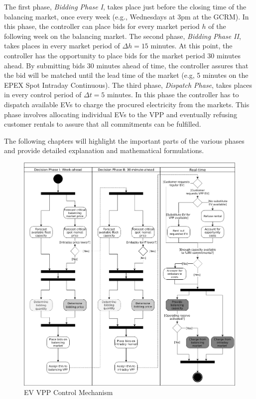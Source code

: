 \documentclass[a4paper, 12pt]{article}
\begin{document}
The first phase, \emph{Bidding Phase I}, takes place just before the closing time of
the balancing market, once every week (e.g., Wednesdays at 3pm at the GCRM). In
this phase, the controller can place bids for every market period \(h\) of the
following week on the balancing market. The second phase, \emph{Bidding Phase II},
takes places in every market period of \(\Delta{h}\!=\!15\) minutes. At this
point, the controller has the opportunity to place bids for the market period 30
minutes ahead. By submitting bids 30 minutes ahead of time, the controller
assures that the bid will be matched until the lead time of the market (e.g, 5
minutes on the EPEX Spot Intraday Continuous). The third phase, \emph{Dispatch
Phase}, takes places in every control period of \(\Delta{t}\!=\!5\) minutes. In
this phase the controller has to dispatch available EVs to charge the procured
electricity from the markets. This phase involves allocating individual EVs to
the VPP and eventually refusing customer rentals to assure that all commitments
can be fulfilled.

The following chapters will highlight the important parts of the various phases
and provide detailed explanation and mathematical formulations.

\begin{figure}[p]
\centering
\includegraphics[width=1\linewidth]{./fig/control_mechanism.png}
\caption[EV VPP Control Mechanism]{EV VPP Control Mechanism \label{fig-control-mechanism}}
\end{figure}
\end{document}
